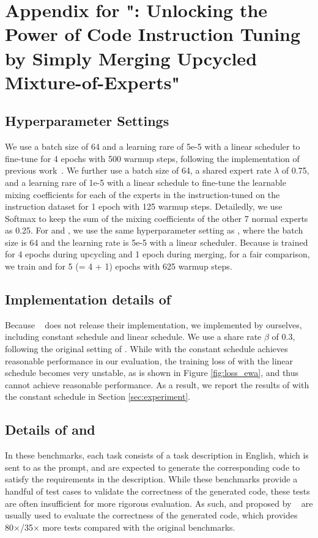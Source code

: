 \section{Appendix for "\ours: Unlocking the Power of Code Instruction Tuning by Simply Merging Upcycled Mixture-of-Experts"}
\label{sec:appendix}

\subsection{Hyperparameter Settings}\label{sec:hyperparameter}
We use a batch size of 64 and a learning rare of 5e-5 with a linear scheduler to fine-tune \textbf{\oursmoe} for 4 epochs with 500 warmup steps, following the implementation of previous work~\cite{wei2023magicoder}. We further use a batch size of 64, a shared expert rate $\lambda$ of 0.75, and a learning rare of 1e-5 with a linear schedule to fine-tune the learnable mixing coefficients for each of the experts in the instruction-tuned \textbf{\oursmoe} on the instruction dataset for 1 epoch with 125 warmup steps. Detailedly, we use Softmax to keep the sum of the mixing coefficients of the other 7 normal experts as 0.25. For \textbf{\baselineds} and \textbf{\ewads}, we use the same hyperparameter setting as \ours, where the batch size is 64 and the learning rate is 5e-5 with a linear scheduler. Because \ours is trained for 4 epochs during upcycling and 1 epoch during merging, for a fair comparison, we train \baselineds and \ewads for 5 (= 4 + 1) epochs with 625 warmup steps.

\subsection{Implementation details of \ewa}\label{sec:ewa_details}
Because \ewa~\cite{huang2023experts} does not release their implementation, we implemented \ewa by ourselves, including constant schedule and linear schedule. We use a share rate $\beta$ of 0.3, following the original setting of \ewa. While \ewa with the constant schedule achieves reasonable performance in our evaluation, the training loss of \ewa with the linear schedule becomes very unstable, as is shown in Figure \ref{fig:loss_ewa}, and thus cannot achieve reasonable performance. As a result, we report the results of \ewa with the constant schedule in Section \ref{sec:experiment}.



\subsection{Details of \humaneval and \mbpp}\label{sec:benchmarks}
In these benchmarks, each task consists of a task description in English, which is sent to  as the prompt, and  are expected to generate the corresponding code to satisfy the requirements in the description. While these benchmarks provide a handful of test cases to validate the correctness of the generated code, these tests are often insufficient for more rigorous evaluation. As such, \humanevalp and \mbppp proposed by \evalplus~\cite{evalplus} are usually used to evaluate the correctness of the generated code, which provides 80×/35× more tests compared with the original benchmarks.

